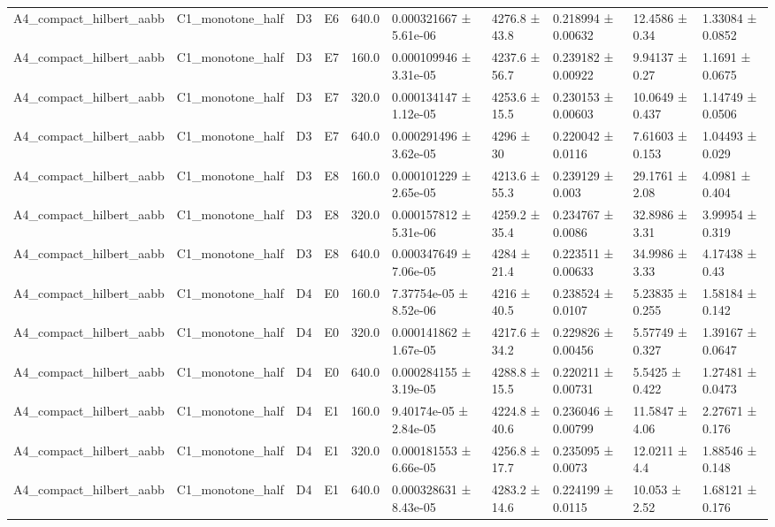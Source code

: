 \begin{table}
\begin{tabular}{llllllllll}
A4\_compact\_hilbert\_aabb & C1\_monotone\_half & D3 & E6 & 640.0 & 0.000321667 ± 5.61e-06 & 4276.8 ± 43.8 & 0.218994 ± 0.00632 & 12.4586 ± 0.34 & 1.33084 ± 0.0852 \\
A4\_compact\_hilbert\_aabb & C1\_monotone\_half & D3 & E7 & 160.0 & 0.000109946 ± 3.31e-05 & 4237.6 ± 56.7 & 0.239182 ± 0.00922 & 9.94137 ± 0.27 & 1.1691 ± 0.0675 \\
A4\_compact\_hilbert\_aabb & C1\_monotone\_half & D3 & E7 & 320.0 & 0.000134147 ± 1.12e-05 & 4253.6 ± 15.5 & 0.230153 ± 0.00603 & 10.0649 ± 0.437 & 1.14749 ± 0.0506 \\
A4\_compact\_hilbert\_aabb & C1\_monotone\_half & D3 & E7 & 640.0 & 0.000291496 ± 3.62e-05 & 4296 ± 30 & 0.220042 ± 0.0116 & 7.61603 ± 0.153 & 1.04493 ± 0.029 \\
A4\_compact\_hilbert\_aabb & C1\_monotone\_half & D3 & E8 & 160.0 & 0.000101229 ± 2.65e-05 & 4213.6 ± 55.3 & 0.239129 ± 0.003 & 29.1761 ± 2.08 & 4.0981 ± 0.404 \\
A4\_compact\_hilbert\_aabb & C1\_monotone\_half & D3 & E8 & 320.0 & 0.000157812 ± 5.31e-06 & 4259.2 ± 35.4 & 0.234767 ± 0.0086 & 32.8986 ± 3.31 & 3.99954 ± 0.319 \\
A4\_compact\_hilbert\_aabb & C1\_monotone\_half & D3 & E8 & 640.0 & 0.000347649 ± 7.06e-05 & 4284 ± 21.4 & 0.223511 ± 0.00633 & 34.9986 ± 3.33 & 4.17438 ± 0.43 \\
A4\_compact\_hilbert\_aabb & C1\_monotone\_half & D4 & E0 & 160.0 & 7.37754e-05 ± 8.52e-06 & 4216 ± 40.5 & 0.238524 ± 0.0107 & 5.23835 ± 0.255 & 1.58184 ± 0.142 \\
A4\_compact\_hilbert\_aabb & C1\_monotone\_half & D4 & E0 & 320.0 & 0.000141862 ± 1.67e-05 & 4217.6 ± 34.2 & 0.229826 ± 0.00456 & 5.57749 ± 0.327 & 1.39167 ± 0.0647 \\
A4\_compact\_hilbert\_aabb & C1\_monotone\_half & D4 & E0 & 640.0 & 0.000284155 ± 3.19e-05 & 4288.8 ± 15.5 & 0.220211 ± 0.00731 & 5.5425 ± 0.422 & 1.27481 ± 0.0473 \\
A4\_compact\_hilbert\_aabb & C1\_monotone\_half & D4 & E1 & 160.0 & 9.40174e-05 ± 2.84e-05 & 4224.8 ± 40.6 & 0.236046 ± 0.00799 & 11.5847 ± 4.06 & 2.27671 ± 0.176 \\
A4\_compact\_hilbert\_aabb & C1\_monotone\_half & D4 & E1 & 320.0 & 0.000181553 ± 6.66e-05 & 4256.8 ± 17.7 & 0.235095 ± 0.0073 & 12.0211 ± 4.4 & 1.88546 ± 0.148 \\
A4\_compact\_hilbert\_aabb & C1\_monotone\_half & D4 & E1 & 640.0 & 0.000328631 ± 8.43e-05 & 4283.2 ± 14.6 & 0.224199 ± 0.0115 & 10.053 ± 2.52 & 1.68121 ± 0.176 \\

\end{tabular}
\end{table}
